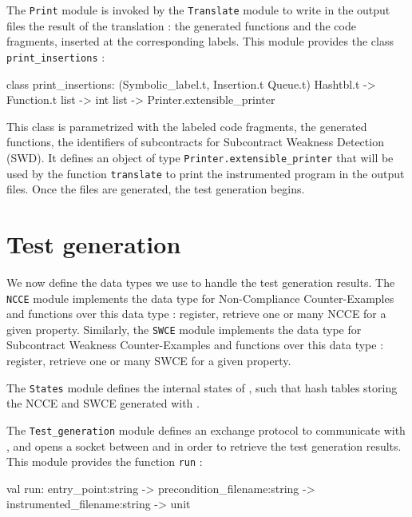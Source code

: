 \documentclass[web]{frama-c-book}
\begin{document}
The \lstinline[language=OCaml]'Print' module is invoked by the \lstinline[language=OCaml]'Translate' module to write in the output files the result of the translation : the generated functions and the code fragments, inserted at the corresponding labels. This module provides the class \lstinline[language=OCaml]'print_insertions' :

\begin{ocamlcode}
  class print_insertions:
    (Symbolic_label.t, Insertion.t Queue.t) Hashtbl.t -> Function.t list -> int list
    -> Printer.extensible_printer
\end{ocamlcode}

This class is parametrized with the labeled code fragments, the generated functions, the identifiers of subcontracts for Subcontract Weakness Detection (SWD). It defines an object of type \lstinline[language=OCaml]'Printer.extensible_printer' that will be used by the function \lstinline[language=OCaml]'translate' to print the instrumented program in the output files. Once the files are generated, the test generation begins.

\section{Test generation}

We now define the data types we use to handle the test generation results.
The \lstinline[language=OCaml]'NCCE' module implements the data type for Non-Compliance Counter-Examples and functions over this data type : register, retrieve one or many NCCE for a given property. Similarly, the \lstinline[language=OCaml]'SWCE' module implements the data type for Subcontract Weakness Counter-Examples and functions over this data type : register, retrieve one or many SWCE for a given property.

The \lstinline[language=OCaml]'States' module defines the internal states of \stady, such that hash tables storing the NCCE and SWCE generated with \pathcrawler.

The \lstinline[language=OCaml]'Test_generation' module defines an exchange protocol to communicate with \pathcrawler, and opens a socket between \stady and \pathcrawler in order to retrieve the test generation results. This module provides the function \lstinline[language=OCaml]'run' :

\begin{ocamlcode}
  val run:
    entry_point:string -> precondition_filename:string -> instrumented_filename:string
    -> unit
\end{ocamlcode}
\end{document}
